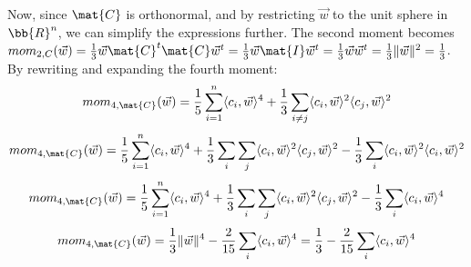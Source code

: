 \begin{itemize}
    Now, since $\mat{C}$ is orthonormal, and by restricting $\vec{w}$ to the unit sphere in $\bb{R}^n$, we can simplify the expressions further.
    The second moment becomes $mom_{2, C}(\vec{w}) = \frac{1}{3} \vec{w} \mat{C}^t \mat{C} \vec{w}^t = \frac{1}{3}\vec{w} \mat{I} \vec{w}^t 
    = \frac{1}{3} \vec{w}\vec{w}^t = \frac{1}{3} \lVert \vec{w} \rVert ^2 = \frac{1}{3}$. \\
    By rewriting and expanding the fourth moment:
    \[ mom_{4, \mat{C}} (\vec{w}) = \frac{1}{5} \sum_{i=1}^{n} \langle c_i, \vec{w} \rangle ^4 + \frac{1}{3} \sum_{i \neq j} \langle c_i, \vec{w} \rangle ^2 \langle c_j, \vec{w} \rangle ^2\]
    \[ mom_{4, \mat{C}} (\vec{w}) = \frac{1}{5} \sum_{i=1}^{n} \langle c_i, \vec{w} \rangle ^4 + 
    \frac{1}{3} \sum_{i} \sum_{j} \langle c_i, \vec{w} \rangle ^2 \langle c_j, \vec{w} \rangle ^2 -
    \frac{1}{3}\sum_{i} \langle c_i, \vec{w} \rangle ^2 \langle c_i, \vec{w} \rangle ^2\]
    \[ mom_{4, \mat{C}} (\vec{w}) = \frac{1}{5} \sum_{i=1}^{n} \langle c_i, \vec{w} \rangle ^4 + 
    \frac{1}{3} \sum_{i} \sum_{j} \langle c_i, \vec{w} \rangle ^2 \langle c_j, \vec{w} \rangle ^2 -
    \frac{1}{3}\sum_{i} \langle c_i, \vec{w} \rangle ^4 \]
    \[ mom_{4, \mat{C}} (\vec{w}) = \frac{1}{3} \lVert \vec{w} \rVert ^4 - 
    \frac{2}{15}\sum_{i} \langle c_i, \vec{w} \rangle ^4 = \frac{1}{3} - 
    \frac{2}{15}\sum_{i} \langle c_i, \vec{w} \rangle ^4\]

\end{itemize}

